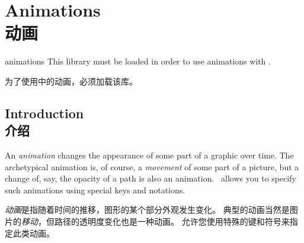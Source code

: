 \setcounter{section}{25}
\setcounter{subsection}{4}
\setcounter{subsubsection}{0}
%
%
%


\section{Animations\\动画}
\label{section-tikz-animations}

\begin{tikzlibrary}{animations}
    This library must be loaded in order to use animations with \tikzname.

    为了使用\tikzname 中的动画，必须加载该库。

\end{tikzlibrary}


\subsection{Introduction\\介绍}

An \emph{animation} changes the appearance of some part of a graphic over time.
The archetypical animation is, of course, a \emph{movement} of some part of a
picture, but a change of, say, the opacity of a path is also an animation.
\tikzname\ allows you to specify such animations using special keys and
notations.

\emph{动画}是指随着时间的推移，图形的某个部分外观发生变化。
典型的动画当然是图片的\emph{移动}，但路径的透明度变化也是一种动画。
\tikzname 允许您使用特殊的键和符号来指定此类动画。

\begin{codeexample}[
    preamble={\usetikzlibrary{animations}},
    width=8cm,
    animation list={0.7,1.4,2.1,2.8},
    animation scale=.25,
]
\end{codeexample}

